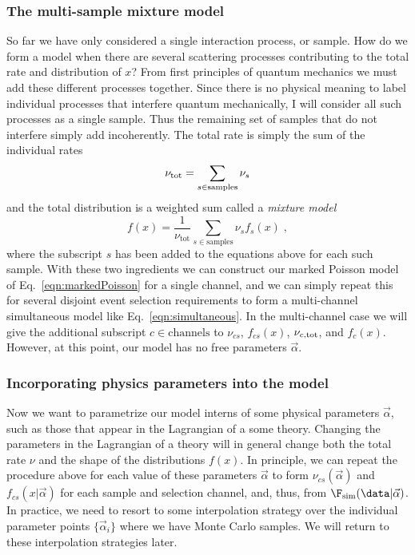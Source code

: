 \subsubsection{The multi-sample mixture model}
So far we have only considered a single interaction process, or sample.  How do we form a model when there are several scattering processes contributing to the total rate and distribution of $x$?  From first principles of quantum mechanics we must add these different processes together.  Since there is no physical meaning to label individual processes that interfere quantum mechanically, I will consider all such processes as a single sample.  Thus the remaining set of samples that do not interfere simply add incoherently.  The total rate is simply the sum of the individual rates
\begin{equation}
\nu_{\rm tot} = \sum_{s\in\textrm{samples}} \nu_s
\end{equation}
and the total distribution is a weighted sum called a \textit{mixture model}
\begin{equation}
f(x) = \frac{1}{\nu_{\textrm{tot}}} \sum_{s\in\textrm{samples}} \nu_s f_s(x)\;,
\end{equation}
where the subscript $s$ has been added to the equations above for each such sample.  With these two ingredients we can construct our  marked Poisson model of Eq.~\ref{eqn:markedPoisson} for a single channel, and we can simply repeat this for several disjoint event selection requirements to form a multi-channel simultaneous model like Eq.~\ref{eqn:simultaneous}.  In the multi-channel case we will give the additional subscript $c\in\textrm{channels}$ to $\nu_{cs}$, $f_{cs}(x)$, $\nu_{c,\rm{tot}}$, and $f_c(x)$. However, at this point, our model has no free parameters $\vec\alpha$.


\subsubsection{Incorporating physics parameters into the model}


Now we want to parametrize our model interns of some physical parameters $\vec\alpha$, such as those that appear in the Lagrangian of a some theory.  Changing the parameters in the Lagrangian of a theory will in general change both the total rate $\nu$ and the shape of the distributions $f(x)$.  In principle, we can repeat the procedure above for each value of these parameters $\vec\alpha$ to form $\nu_{cs}(\vec\alpha)$ and $f_{cs}(x|\vec\alpha)$ for each sample and selection channel, and, thus, from $\F_\textrm{sim}(\data|\vec\alpha)$.  In practice, we need to resort to some interpolation strategy over the individual parameter points $\{\vec\alpha_i\}$ where we have Monte Carlo samples.  We will return to these interpolation strategies later.


